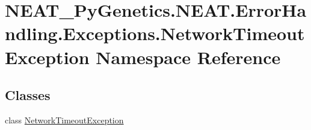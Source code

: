 \hypertarget{namespaceNEAT__PyGenetics_1_1NEAT_1_1ErrorHandling_1_1Exceptions_1_1NetworkTimeoutException}{}\section{N\+E\+A\+T\+\_\+\+Py\+Genetics.\+N\+E\+A\+T.\+Error\+Handling.\+Exceptions.\+Network\+Timeout\+Exception Namespace Reference}
\label{namespaceNEAT__PyGenetics_1_1NEAT_1_1ErrorHandling_1_1Exceptions_1_1NetworkTimeoutException}
\subsection*{Classes}
\begin{DoxyCompactItemize}
\item 
class \hyperlink{classNEAT__PyGenetics_1_1NEAT_1_1ErrorHandling_1_1Exceptions_1_1NetworkTimeoutException_1_1NetworkTimeoutException}{Network\+Timeout\+Exception}
\end{DoxyCompactItemize}

